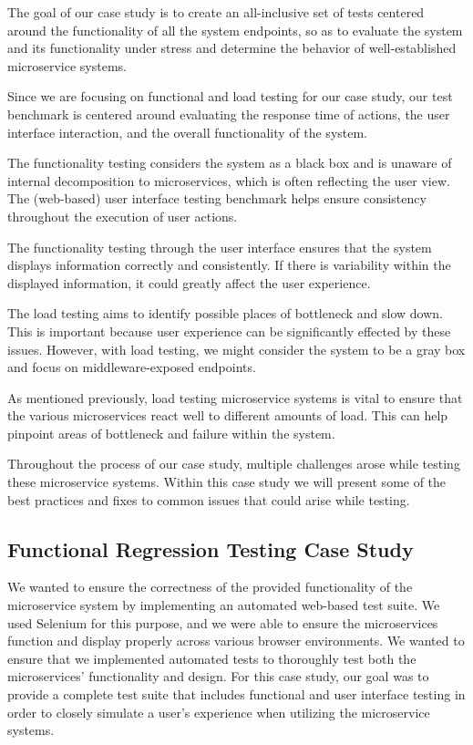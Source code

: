 The goal of our  case study is to create an all-inclusive set of tests centered around the functionality of all the system endpoints, so as to  evaluate the system and its functionality under stress and  determine the behavior of well-established microservice systems.


Since we are focusing on functional and load testing for our case study, our test benchmark is centered around evaluating the response time of actions, the user interface interaction, and the overall functionality of the system. 

The functionality testing considers the system as a black box and is unaware of internal decomposition to microservices, which is often reflecting the user view. The (web-based) user interface testing benchmark helps ensure consistency throughout the execution of user actions.

The functionality testing through the user interface ensures that the system displays information correctly and consistently. If there is variability within the displayed information, it could greatly affect the user experience.

The load testing aims to identify possible places of bottleneck and slow down. This is important because user experience can be significantly effected by these issues. However, with load testing, we might consider the system to be a gray box and focus on middleware-exposed endpoints.



As mentioned previously, load testing microservice systems is vital to ensure that the various microservices react well to different amounts of load. This can help pinpoint areas of bottleneck and failure within the system. 


Throughout the process of our case study, multiple challenges arose while testing these microservice systems. Within this case study we will present some of the best practices and fixes to common issues that could arise while testing. 

\subsection{Functional Regression Testing Case Study}

We wanted to ensure the correctness of the provided functionality of the microservice system by implementing an automated web-based test suite. We used Selenium for this purpose, and we were able to ensure the microservices function and display properly across various browser environments. We wanted to ensure that we implemented automated tests to thoroughly test both the microservices' functionality and design. For this case study, our goal was to provide a complete test suite that includes functional and user interface testing in order to closely simulate a user’s experience when utilizing the microservice systems. 

